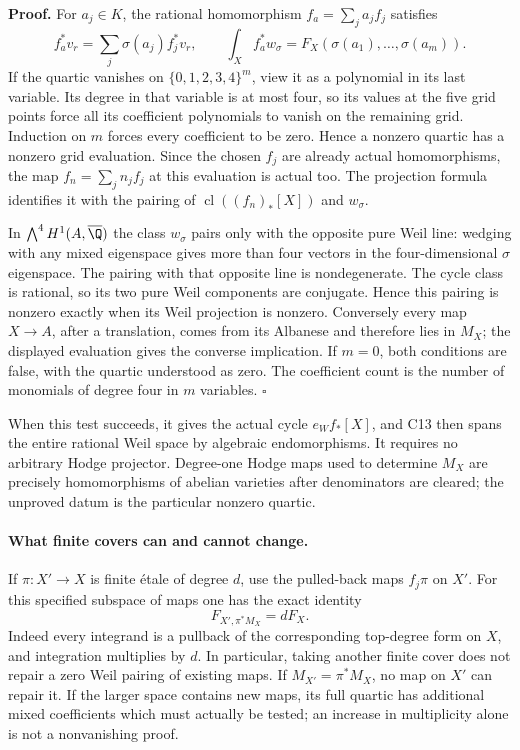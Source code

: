 \textbf{Proof.}
For $a_j\in K$, the rational homomorphism
$f_a=\sum_j a_jf_j$ satisfies
\[
 f_a^*v_r=\sum_j\sigma(a_j)f_j^*v_r,
 \qquad
       \int_X f_a^*w_\sigma
                  =F_X(\sigma(a_1),\ldots,\sigma(a_m)).
\]
If the quartic vanishes on $\{0,1,2,3,4\}^m$, view it
as a polynomial in its last variable.  Its degree in
that variable is at most four, so its values at the
five grid points force all its coefficient polynomials
to vanish on the remaining grid.  Induction on $m$
forces every coefficient to be zero.  Hence a nonzero
quartic has a nonzero grid evaluation.  Since the
chosen $f_j$ are already actual homomorphisms, the map
$f_n=\sum_jn_jf_j$ at this evaluation is actual too.
The projection formula identifies it with the pairing
of $\operatorname{cl}((f_n)_*[X])$ and $w_\sigma$.

In $\bigwedge^4H^1(A,\overline\Q)$ the class
$w_\sigma$ pairs only with the opposite pure Weil line:
wedging with any mixed eigenspace gives more than four
vectors in the four-dimensional $\sigma$ eigenspace.
The pairing with that opposite line is nondegenerate.
The cycle class is rational, so its two pure Weil
components are conjugate.  Hence this pairing is
nonzero exactly when its Weil projection is nonzero.
Conversely every map $X\to A$, after a translation,
comes from its Albanese and therefore lies in $M_X$;
the displayed evaluation gives the converse implication.
If $m=0$, both conditions are false, with the quartic
understood as zero.  The coefficient count is the
number of monomials of degree four in $m$ variables.
\hfill$\square$

When this test succeeds, it gives the actual cycle
$e_W f_*[X]$, and C13 then spans the entire rational
Weil space by algebraic endomorphisms.  It requires
no arbitrary Hodge projector.  Degree-one Hodge maps
used to determine $M_X$ are precisely homomorphisms
of abelian varieties after denominators are cleared;
the unproved datum is the particular nonzero quartic.

\paragraph{What finite covers can and cannot change.}
If $\pi:X'\to X$ is finite \'etale of degree $d$, use
the pulled-back maps $f_j\pi$ on $X'$.  For this specified
subspace of maps one has the exact identity
\begin{equation}\label{C27-cover}
                         F_{X',\pi^*M_X}=dF_X.
\end{equation}
Indeed every integrand is a pullback of the corresponding
top-degree form on $X$, and integration multiplies by
$d$.  In particular, taking another finite cover does
not repair a zero Weil pairing of existing maps.
If $M_{X'}=\pi^*M_X$, no map on $X'$ can repair it.
If the larger space contains new maps, its full quartic
has additional mixed coefficients which must actually
be tested; an increase in multiplicity alone is not
a nonvanishing proof.

